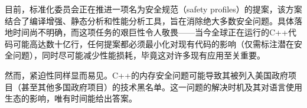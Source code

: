 目前，标准化委员会正在推进一项名为安全规范（safety profiles）的提案，该方案结合了编译增强、静态分析和性能分析工具，旨在消除绝大多数安全问题。具体落地时间尚不明确，而这项任务的艰巨性令人敬畏——当今全球正在运行的C++代码可能高达数十亿行，任何提案都必须最小化对现有代码的影响（仅需标注潜在安全问题），同时尽可能减少性能损耗，毕竟这对许多现有应用至关重要。

然而，紧迫性同样显而易见。C++的内存安全问题可能导致其被列入美国政府项目（甚至其他多国政府项目）的技术黑名单。这一问题的解决时机及其对语言使用生态的影响，唯有时间能给出答案。